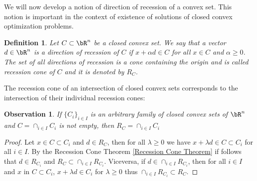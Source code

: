 \documentclass[11pt,a4paper,oneside,openany]{book}
\newtheorem{definition}{Definition}
\newtheorem{observation}[theorem]{Observation}
\numberwithin{definition}{section}
\numberwithin{theorem}{section}
\numberwithin{problem}{section}
\begin{document}
We will now develop a notion of direction of recession of a convex set. This notion is important in the context of existence of solutions of closed convex optimization problems.

\begin{definition}
    Let $C\subset \bR^n$ be a closed convex set. We say that a vector $d \in \bR^n$ is a \emph{direction of recession} of $C$ if $x + \alpha d\in C$ for all $x \in C$ and $\alpha \geq 0$. The set of all  directions of recession is a cone containing the origin and is called \emph{recession cone} of $C$ and it is denoted by $R_C$.
\end{definition}
The recession cone of an intersection of closed convex sets corresponds to the intersection of their individual recession cones:
\begin{observation}\label{intersection of R_C obs}
    If $\{C_i\}_{i \in I}$ is an arbitrary family of closed convex sets of $\bR^n$ and $C = \cap_{i \in I}C_i$ is not empty, then $R_C = \cap_{i \in I}C_i$
\end{observation}
\begin{proof}
    Let $ x \in C \subset C_i$ and $d \in R_C$, then for all $\lambda \geq 0$ we have $x + \lambda d \in C \subset C_i$ for all $i \in I$. By the Recession Cone Theorem \ref{Recession Cone Theorem} if follows  that $d \in R_{C_i}$ and $R_C \subset \cap_{i \in I}R_{C_i}$. Viceversa, if $d \in \cap_{i \in I}R_{C_i}$, then for all $i \in I$ and $x$ in $C \subset C_i$, $x + \lambda d \in C_i$ for $\lambda \geq 0$ thus $\cap_{i \in I} R_{C_i}\subset R_C$.
\end{proof}
\end{document}
